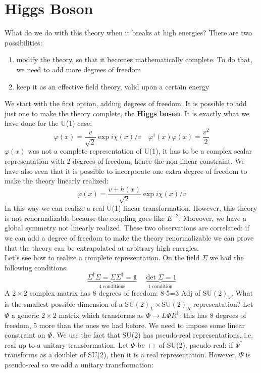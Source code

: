 \documentclass[../main.tex]{subfiles}
\begin{document}
\section{Higgs Boson}
What do we do with this theory when it breaks at high energies? There are two possibilities:
\begin{enumerate}
    \item modify the theory, so that it becomes mathematically complete. To do that, we need to add more degrees of freedom
    \item keep it as an effective field theory, valid upon a certain energy
\end{enumerate}
We start with the first option, adding degrees of freedom. It is possible to add just one to make the theory complete, the \textbf{Higgs boson}. It is exactly what we have done for the U(1) case:
\[
\varphi(x)=\frac{v}{\sqrt{2}}\exp{i\chi(x)/v} \quad \varphi^\dagger(x)\varphi(x)=\frac{v^2}{2}
\]
$\varphi(x)$ was not a complete representation of U(1), it has to be a complex scalar representation with 2 degrees of freedom, hence the non-linear constraint. We have also seen that it is possible to incorporate one extra degree of freedom to make the theory linearly realized:
\[
\varphi(x)=\frac{v+h(x)}{\sqrt{2}}\exp{i\chi(x)/v}
\]
In this way we can realize a real U(1) linear transformation. However, this theory is not renormalizable because the coupling goes like $E^{-2}$. Moreover, we have a global symmetry not linearly realized. These two observations are correlated: if we can add a degree of freedom to make the theory renormalizable we can prove that the theory can be extrapolated at arbitrary high energies. \\
Let's see how to realize a complete representation. On the field $\Sigma$ we had the following conditions:
\[
\underbrace{\Sigma^\dagger\Sigma=\Sigma\Sigma^\dagger=\mathbb{1}}_{\text{4 conditions}} \quad \underbrace{\det\Sigma=1}_{\text{1 condition}}
\]
A $2\times2$ complex matrix has 8 degrees of freedom: 8-5=3 Adj of SU$(2)_V$. What is the smallest possible dimension of a SU$(2)_L\times$SU$(2)_R$ representation? Let $\Phi$ a generic $2\times2$ matrix which transforms as $\Phi\to L\Phi R^\dagger$: this has 8 degrees of freedom, 5 more than the ones we had before. We need to impose some linear constraint on $\Phi$. We use the fact that SU(2) has pseudo-real representations, i.e. real up to a unitary transformation. Let $\Psi$ be $\Box$ of SU(2), pseudo real: if $\Psi^*$ transforms as a doublet of SU(2), then it is a real representation. However, $\Psi$ is pseudo-real so we add a unitary transformation:
\end{document}
